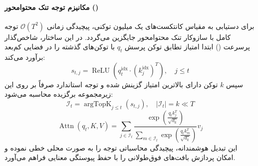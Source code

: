 \paragraph*{مکانیزم توجه تنک محتوامحور ()}
برای دستیابی به مقیاس کانتکست‌های یک میلیون توکنی، پیچیدگی زمانی $\mathcal{O}(T^2)$ توجه کامل با سازوکار تنک محتوامحور  جایگزین می‌گردد. در این ساختار، شاخص‌گذار پرسرعت () ابتدا امتیاز تطابق توکن پرسش $q_t$ با توکن‌های گذشته را در فضایی کم‌بعد برآورد می‌کند:
\begin{equation}
    s_{t, j} = \operatorname{ReLU}\left( q_t^{\text{idx}} \cdot (k_j^{\text{idx}})^T \right), \quad j \le t
\end{equation}
سپس $k$ توکن دارای بالاترین امتیاز گزینش شده و توجه استاندارد صرفاً بر روی این زیرمجموعه برگزیده محاسبه می‌شود:
\begin{equation}
    \mathcal{I}_t = \operatorname{argTopK}_{j \le t} (s_{t, j}), \quad |\mathcal{I}_t| = k \ll T
\end{equation}
\begin{equation}
    \operatorname{Attn}(q_t, K, V) = \sum_{j \in \mathcal{I}_t} \frac{\exp\left( \frac{q_t k_j^T}{\sqrt{d_k}} \right)}{\sum_{m \in \mathcal{I}_t} \exp\left( \frac{q_t k_m^T}{\sqrt{d_k}} \right)} v_j
\end{equation}
این تبدیل هوشمندانه، پیچیدگی محاسباتی توجه را به صورت محلی خطی نموده و امکان پردازش بافت‌های فوق‌طولانی را با حفظ پیوستگی معنایی فراهم می‌آورد.